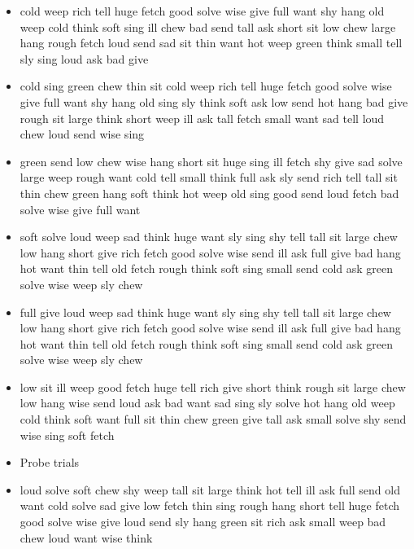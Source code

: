 \documentclass[10pt,letterpaper]{article}
\begin{document}
\begin{itemize}
  \item cold weep rich tell huge fetch good solve wise give full want
    shy hang old weep cold think soft sing ill chew bad send tall ask
    short sit low chew large hang rough fetch loud send sad sit thin
    want hot weep green think small tell sly sing loud ask bad give

  \item cold sing green chew thin sit cold weep rich tell huge fetch
    good solve wise give full want shy hang old sing sly think soft
    ask low send hot hang bad give rough sit large think short weep
    ill ask tall fetch small want sad tell loud chew loud send wise
    sing

  \item green send low chew wise hang short sit huge sing ill fetch
    shy give sad solve large weep rough want cold tell small think
    full ask sly send rich tell tall sit thin chew green hang soft
    think hot weep old sing good send loud fetch bad solve wise give
    full want

  \item soft solve loud weep sad think huge want sly sing shy tell
    tall sit large chew low hang short give rich fetch good solve wise
    send ill ask full give bad hang hot want thin tell old fetch rough
    think soft sing small send cold ask green solve wise weep sly chew

  \item full give loud weep sad think huge want sly sing shy tell tall
    sit large chew low hang short give rich fetch good solve wise send
    ill ask full give bad hang hot want thin tell old fetch rough
    think soft sing small send cold ask green solve wise weep sly chew

  \item low sit ill weep good fetch huge tell rich give short think
    rough sit large chew low hang wise send loud ask bad want sad sing
    sly solve hot hang old weep cold think soft want full sit thin
    chew green give tall ask small solve shy send wise sing soft fetch

  \item Probe trials

  \item loud solve soft chew shy weep tall sit large think hot tell
    ill ask full send old want cold solve sad give low fetch thin sing
    rough hang short tell huge fetch good solve wise give loud send
    sly hang green sit rich ask small weep bad chew loud want wise
    think


\end{itemize}
\end{document}
